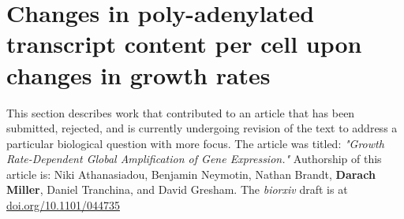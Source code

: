 %

%
%
%
\section{Changes in poly-adenylated transcript content per cell 
upon changes in growth rates}
%
%
%

This section describes work that contributed to an article that 
has been submitted, rejected, and is currently undergoing revision 
of the text to address a particular biological question with more
focus.
The article was titled:
\textit{"Growth Rate-Dependent Global Amplification of Gene Expression."}
Authorship of this article is: 
Niki Athanasiadou, Benjamin Neymotin, Nathan Brandt, 
\textbf{Darach Miller}, Daniel Tranchina, and David Gresham.
The \textit{biorxiv} draft is at \url{doi.org/10.1101/044735}

